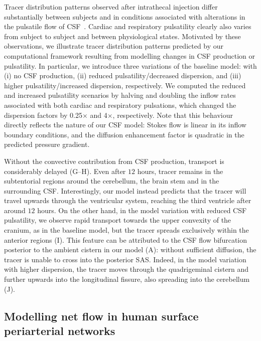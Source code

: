 \documentclass[fleqn,10pt]{wlscirep}
\begin{document}
Tracer distribution patterns observed after intrathecal injection
differ substantially between subjects and in conditions associated
with alterations in the pulsatile flow of CSF~\cite{ringstad2018brain,
  eide2021direction, eide2021impaired, eide2022altered}. Cardiac and
respiratory pulsatility clearly also varies from subject to subject
and between physiological states. Motivated by these observations, we
illustrate tracer distribution patterns predicted by our computational
framework resulting from modelling changes in CSF production or
pulsatility. 
%
In particular, we introduce three variations of the
baseline model: with (i) no CSF production, (ii) reduced
pulsatility/decreased dispersion, and (iii) higher
pulsatility/increased dispersion, respectively. We computed the
reduced and increased pulsatility scenarios by halving and doubling
the inflow rates associated with both cardiac and respiratory
pulsations, which changed the dispersion factors by 0.25$\times$ and
4$\times$, respectively. Note that this behaviour directly reflects
the nature of our CSF model: Stokes flow is linear in its inflow
boundary conditions, and the diffusion enhancement factor is quadratic
in the predicted pressure gradient.

Without the convective contribution from CSF production, transport is
considerably delayed (G--H). Even after $12$ hours,
tracer remains in the subtentorial regions around the cerebellum, the
brain stem and in the surrounding CSF. Interestingly, our model
instead predicts that the tracer will travel upwards through the
ventricular system, reaching the third ventricle after around $12$
hours. On the other hand, in the model variation with reduced CSF
pulsatility, we observe rapid transport towards the upper convexity of
the cranium, as in the baseline model, but the tracer spreads
exclusively within the anterior regions (I). This
feature can be attributed to the CSF flow bifurcation posterior to the
ambient cistern in our model (A): without sufficient
diffusion, the tracer is unable to cross into the posterior
SAS. Indeed, in the model variation with higher dispersion, the tracer
moves through the quadrigeminal cistern and further upwards into the
longitudinal fissure, also spreading into the cerebellum
(J).




\subsection*{Modelling net flow in human surface periarterial networks}
\label{sec:pvs_flow_results}
\end{document}
